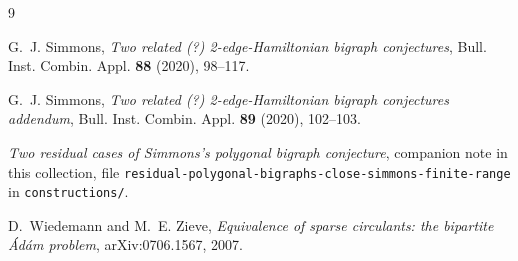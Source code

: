 \documentclass[11pt]{amsart}
\begin{document}
\begin{thebibliography}{9}

G.~J. Simmons,
\emph{Two related (?) 2-edge-Hamiltonian bigraph conjectures},
Bull. Inst. Combin. Appl. \textbf{88} (2020), 98--117.

G.~J. Simmons,
\emph{Two related (?) 2-edge-Hamiltonian bigraph conjectures addendum},
Bull. Inst. Combin. Appl. \textbf{89} (2020), 102--103.

\emph{Two residual cases of Simmons's polygonal bigraph conjecture},
companion note in this collection, file
\texttt{residual-polygonal-bigraphs-\allowbreak close-simmons-finite-range}
in \texttt{constructions/}.

D.~Wiedemann and M.~E. Zieve,
\emph{Equivalence of sparse circulants: the bipartite \'Ad\'am problem},
arXiv:0706.1567, 2007.

\end{thebibliography}
\end{document}
